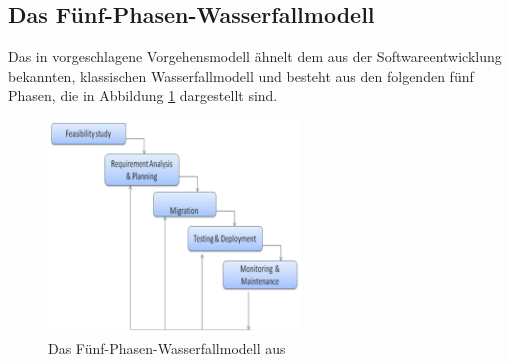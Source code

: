 \subsection{Das Fünf-Phasen-Wasserfallmodell}
Das in  vorgeschlagene Vorgehensmodell ähnelt dem aus der 
Softwareentwicklung bekannten, klassischen Wasserfallmodell und besteht aus den 
folgenden fünf Phasen, die in Abbildung 
\ref{fuenf-phasen-wasserfall-modell}
dargestellt sind.
\begin{figure}[h]
\begin{center}
\includegraphics[width=0.6\textwidth]{images/fuenf-phasen-wasserfall-modell.png}
\caption{Das Fünf-Phasen-Wasserfallmodell aus \protect{} }
\label{fuenf-phasen-wasserfall-modell}
\end{center}
\end{figure}
